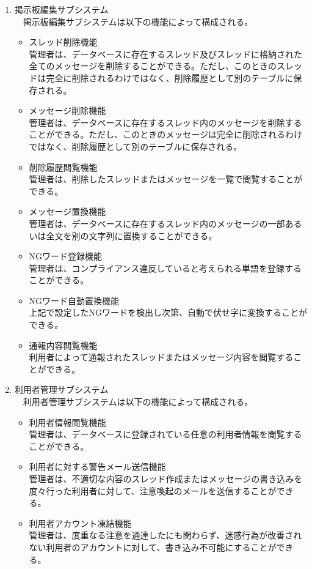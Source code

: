 \documentclass[a4j]{jarticle}
\begin{document}
\begin{enumerate}
  \item 掲示板編集サブシステム\\
  　掲示板編集サブシステムは以下の機能によって構成される。
  \begin{itemize}
    \item スレッド削除機能\\
    管理者は、データベースに存在するスレッド及びスレッドに格納された全てのメッセージを削除することができる。ただし、このときのスレッドは完全に削除されるわけではなく、削除履歴として別のテーブルに保存される。
    \item メッセージ削除機能\\
    管理者は、データベースに存在するスレッド内のメッセージを削除することができる。ただし、このときのメッセージは完全に削除されるわけではなく、削除履歴として別のテーブルに保存される。
    \item 削除履歴閲覧機能\\
    管理者は、削除したスレッドまたはメッセージを一覧で閲覧することができる。
    \item メッセージ置換機能\\
    管理者は、データベースに存在するスレッド内のメッセージの一部あるいは全文を別の文字列に置換することができる。
    \item NGワード登録機能\\
    管理者は、コンプライアンス違反していると考えられる単語を登録することができる。
    \item NGワード自動置換機能\\
    上記で設定したNGワードを検出し次第、自動で伏せ字に変換することができる。
    \item 通報内容閲覧機能\\
    利用者によって通報されたスレッドまたはメッセージ内容を閲覧することができる。\\
  \end{itemize}

  \item 利用者管理サブシステム\\
  　利用者管理サブシステムは以下の機能によって構成される。
  \begin{itemize}
    \item 利用者情報閲覧機能\\
    管理者は、データベースに登録されている任意の利用者情報を閲覧することができる。
    \item 利用者に対する警告メール送信機能\\
    管理者は、不適切な内容のスレッド作成またはメッセージの書き込みを度々行った利用者に対して、注意喚起のメールを送信することができる。
    \item 利用者アカウント凍結機能\\
    管理者は、度重なる注意を通達したにも関わらず、迷惑行為が改善されない利用者のアカウントに対して、書き込み不可能にすることができる。\\
  \end{itemize}


\end{enumerate}
\end{document}
